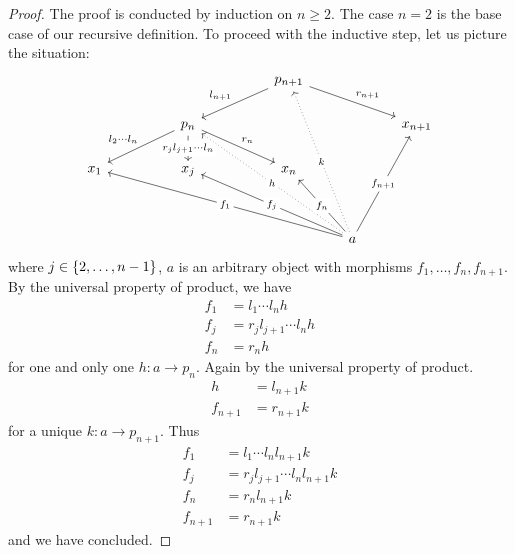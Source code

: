 \begin{proof}
The proof is conducted by induction on \(n \ge 2\). The case \(n=2\) is the base case of our recursive definition. To proceed with the inductive step, let us picture the situation:
\[\begin{tikzcd}
& & & & p_{n+1} \ar["{l_{n+1}}", dll, swap] \ar["{r_{n+1}}", drr] \\
& & p_n \ar["{l_2\cdots{}l_n}", dll, swap] \ar["{r_jl_{j+1}\cdots{}l_n}" description, d] \ar["{r_n}", drr] & & & & x_{n+1} \\
x_1 & & x_j & & x_n \\
\\
& & & & & a
  \ar["{f_1}" description, uulllll]
  \ar["{f_j}" description, uulll]
  \ar["h" description, uuulll, dotted]
  \ar["{f_n}" description, uul]
  \ar["k" description, uuuul, dotted]
  \ar["{f_{n+1}}" description, uuur]
\end{tikzcd}\]
where \(j \in \left\{2, \dots{}, n-1\right\}\), \(a\) is an arbitrary object with morphisms \(f_1, \dots{}, f_n, f_{n+1}\). By the universal property of product, we have
\[\begin{aligned}
f_1 &= l_1 \cdots{} l_n h \\
f_j &= r_jl_{j+1} \cdots{} l_n h \\
f_n &= r_n h
\end{aligned}\]
for one and only one \(h : a \to p_n\). Again by the universal property of product.
\[\begin{aligned}
h &= l_{n+1} k \\
f_{n+1} &= r_{n+1} k
\end{aligned}\]
for a unique \(k : a \to p_{n+1}\). Thus
\[\begin{aligned}
f_1 &= l_1 \cdots{} l_n l_{n+1} k \\
f_j &= r_jl_{j+1} \cdots{} l_n l_{n+1} k \\
f_n &= r_n l_{n+1} k \\
f_{n+1} &= r_{n+1} k
\end{aligned}\]
and we have concluded.
\end{proof}


